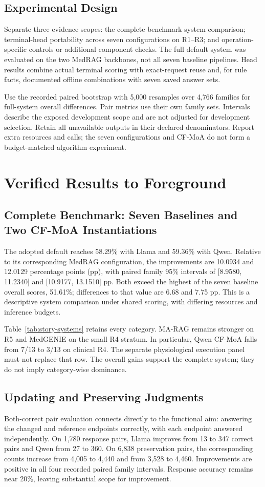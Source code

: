 \documentclass[11pt,a4paper]{article}
\begin{document}
\subsection{Experimental Design}
Separate three evidence scopes: the complete benchmark system comparison; terminal-head portability across seven configurations on R1--R3; and operation-specific controls or additional component checks. The full default system was evaluated on the two MedRAG backbones, not all seven baseline pipelines. Head results combine actual terminal scoring with exact-request reuse and, for rule facts, documented offline combinations with seven saved answer sets.

Use the recorded paired bootstrap with 5,000 resamples over 4,766 families for full-system overall differences. Pair metrics use their own family sets. Intervals describe the exposed development scope and are not adjusted for development selection. Retain all unavailable outputs in their declared denominators. Report extra resources and calls; the seven configurations and CF-MoA do not form a budget-matched algorithm experiment.

\section{Verified Results to Foreground}
\subsection{Complete Benchmark: Seven Baselines and Two CF-MoA Instantiations}

The adopted default reaches 58.29\% with Llama and 59.36\% with Qwen. Relative to its corresponding MedRAG configuration, the improvements are 10.0934 and 12.0129 percentage points (pp), with paired family 95\% intervals of [8.9580, 11.2340] and [10.9177, 13.1510] pp. Both exceed the highest of the seven baseline overall scores, 51.61\%; differences to that value are 6.68 and 7.75 pp. This is a descriptive system comparison under shared scoring, with differing resources and inference budgets.

Table~\ref{tab:story-systems} retains every category. MA-RAG remains stronger on R5 and MedGENIE on the small R4 stratum. In particular, Qwen CF-MoA falls from 7/13 to 3/13 on clinical R4. The separate physiological execution panel must not replace that row. The overall gains support the complete system; they do not imply category-wise dominance.

\subsection{Updating and Preserving Judgments}

Both-correct pair evaluation connects directly to the functional aim: answering the changed and reference endpoints correctly, with each endpoint answered independently. On 1,780 response pairs, Llama improves from 13 to 347 correct pairs and Qwen from 27 to 360. On 6,838 preservation pairs, the corresponding counts increase from 4,005 to 4,440 and from 3,528 to 4,460. Improvements are positive in all four recorded paired family intervals. Response accuracy remains near 20\%, leaving substantial scope for improvement.
\end{document}
